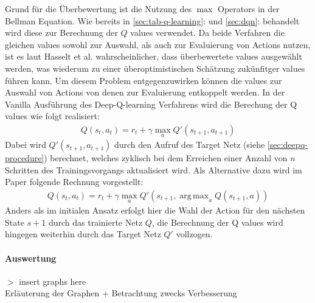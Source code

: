 \documentclass[11pt]{scrartcl}
\DeclareMathOperator*{\argmax}{arg\,max}
\begin{document}
Grund für die Überbewertung ist die Nutzung des $\max$ Operators in der Bellman Equation.
Wie bereits in \autoref{sec:tab-q-learning}: und \autoref{sec:dqn}:
 behandelt wird diese zur Berechnung der $Q$ values verwendet. Da beide
Verfahren die gleichen values sowohl zur Auswahl, als auch zur Evaluierung von Actions nutzen,
ist es laut Hasselt et al.\cite[~S.2]{HGD2015} wahrscheinlicher, dass überbewertete values
ausgewählt werden, was wiederum zu einer überoptimistischen Schätzung zukünfitger values führen
kann. Um diesem Problem entgegenzuwirken können die values zur Auswahl von Actions von denen
zur Evaluierung entkoppelt werden. In der Vanilla Ausführung des Deep-Q-learning Verfahrens
wird die Berechung der Q values wie folgt realisiert:
\begin{align}
Q(s_t, a_t) = r_t + \gamma\max_{a}Q'(s_{t+1},a_{t+1})
\label{aln:double-dqn-q-values}
\end{align}
Dabei wird $Q'(s_{t+1}, a_{t+1})$ durch den Aufruf des Target Netz (siehe 
\autoref{sec:deepq-procedure}) berechnet, welches zyklisch bei dem Erreichen einer Anzahl von
$n$ Schritten des Trainingsvorgangs aktualisiert wird. Als Alternative dazu wird im Paper
folgende Rechnung vorgestellt:
\begin{align}
Q(s_t, a_t) = r_t + \gamma\max_{a}Q'(s_{t+1},\argmax_{a}Q(s_{t+1},a))
\label{aln:double-dqn-q-values-improved}
\end{align}
Anders als im initialen Ansatz erfolgt hier die Wahl der Action für den nächsten State $s+1$
durch das trainierte Netz $Q$, die Berechnung der Q values wird hingegen weiterhin durch das
Target Netz $Q'$ vollzogen.

\paragraph*{Auswertung}
\noindent
\newline
$>$ insert graphs here \\
Erläuterung der Graphen + Betrachtung zwecks Verbesserung
\end{document}
